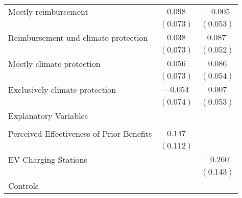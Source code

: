 \begin{center}
\begin{tiny}
\begin{longtable}{l@{} c@{} c@{}}
\quad Mostly reimbursement                                                                             & $0.098$          & $-0.005$         \\
                                                                                                       & $(0.073)$        & $(0.053)$        \\
\quad Reimbursement und climate protection                                                             & $0.038$          & $0.087^{\cdot}$  \\
                                                                                                       & $(0.073)$        & $(0.052)$        \\
\quad Mostly climate protection                                                                        & $0.056$          & $0.086$          \\
                                                                                                       & $(0.073)$        & $(0.054)$        \\
\quad Exclusively climate protection                                                                   & $-0.054$         & $0.007$          \\
                                                                                                       & $(0.074)$        & $(0.053)$        \\
Explanatory Variables                                                                                  &                  &                  \\
                                                                                                       &                  &                  \\
\quad Perceived Effectiveness of Prior Benefits                                                        & $0.147$          &                  \\
                                                                                                       & $(0.112)$        &                  \\
\quad EV Charging Stations                                                                             &                  & $-0.260^{\cdot}$ \\
                                                                                                       &                  & $(0.143)$        \\
Controls                                                                                               &                  &                  \\

\end{longtable}
\end{tiny}
\end{center}
